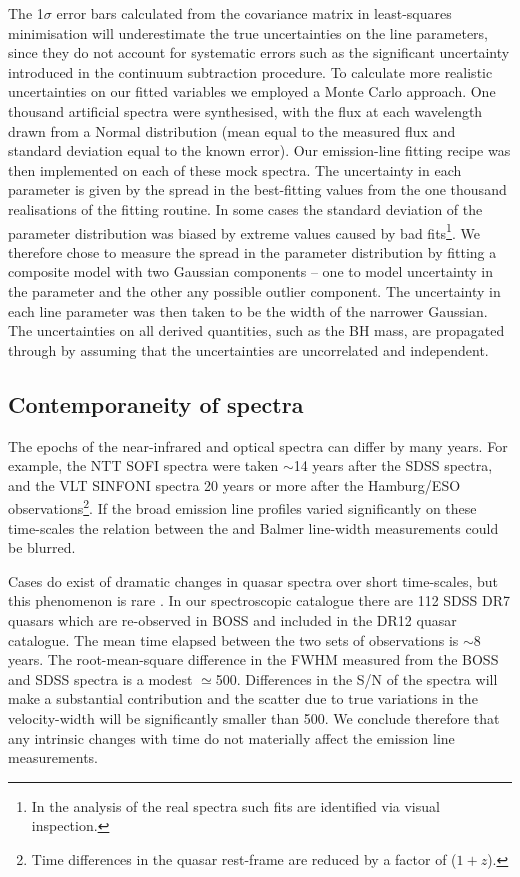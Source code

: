 The 1$\sigma$ error bars calculated from the covariance matrix in least-squares minimisation will underestimate the true uncertainties on the line parameters, since they do not account for systematic errors such as the significant uncertainty introduced in the continuum subtraction procedure.  
To calculate more realistic uncertainties on our fitted variables we employed a Monte Carlo approach. 
One thousand artificial spectra were synthesised, with the flux at each wavelength drawn from a Normal distribution (mean equal to the measured flux and standard deviation equal to the known error).
Our emission-line fitting recipe was then implemented on each of these mock spectra. 
The uncertainty in each parameter is given by the spread in the best-fitting values from the one thousand realisations of the fitting routine. 
In some cases the standard deviation of the parameter distribution was biased by extreme values caused by bad fits\footnote{In the analysis of the real spectra such fits are identified via visual inspection.}. 
We therefore chose to measure the spread in the parameter distribution by fitting a composite model with two Gaussian components -- one to model uncertainty in the parameter and the other any possible outlier component. 
The uncertainty in each line parameter was then taken to be the width of the narrower Gaussian. 
The uncertainties on all derived quantities, such as the BH mass, are propagated through by assuming that the uncertainties are uncorrelated and independent. 

\subsection{Contemporaneity of spectra}

The epochs of the near-infrared and optical spectra can differ by many years.
For example, the NTT SOFI spectra were taken $\sim$14 years after the SDSS spectra, and the VLT SINFONI spectra 20 years or more after the Hamburg/ESO observations\footnote{Time differences in the quasar rest-frame are reduced by a factor of ($1 + z$).}.
If the broad emission line profiles varied significantly on these time-scales the relation between the  and Balmer line-width measurements could be blurred. 

Cases do exist of dramatic changes in quasar spectra over short time-scales, but this phenomenon is rare \citep{macleod16}. 
In our spectroscopic catalogue there are 112 SDSS DR7 quasars which are re-observed in BOSS and included in the DR12 quasar catalogue. 
The mean time elapsed between the two sets of observations is $\sim$8 years. 
The root-mean-square difference in the  FWHM measured from the BOSS and SDSS spectra is a modest $\simeq$500\kms. 
Differences in the S/N of the spectra will make a substantial contribution and the scatter due to true variations in the  velocity-width will be significantly smaller than 500\kms. 
We conclude therefore that any intrinsic changes with time do not materially affect the emission line measurements.

